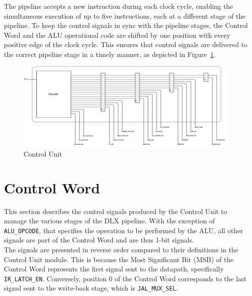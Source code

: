 The pipeline accepts a new instruction during each clock cycle, enabling the simultaneous execution of up to five instructions, each at a different stage of the pipeline. To keep the control signals in sync with the pipeline stages, the Control Word and the ALU operational code are shifted by one position with every positive edge of the clock cycle. This ensures that control signals are delivered to the correct pipeline stage in a timely manner, as depicted in Figure~\ref{fig:control_unit}.

\begin{figure}[!htbp]
    \centering
    \includegraphics[width=0.98\textwidth]{source/figures/control_unit.pdf}
    \caption{Control Unit}
    \label{fig:control_unit}
\end{figure}

\section{Control Word}
This section describes the control signals produced by the Control Unit to manage the various stages of the DLX pipeline. With the exception of \texttt{ALU\_OPCODE}, that specifies the operation to be performed by the ALU, all other signals are part of the Control Word and are thus 1-bit signals. \\

The signals are presented in reverse order compared to their definitions in the Control Unit module. This is because the Most Significant Bit (MSB) of the Control Word represents the first signal sent to the datapath, specifically \texttt{IR\_LATCH\_EN}. Conversely, position 0 of the Control Word corresponds to the last signal sent to the write-back stage, which is \texttt{JAL\_MUX\_SEL}.

